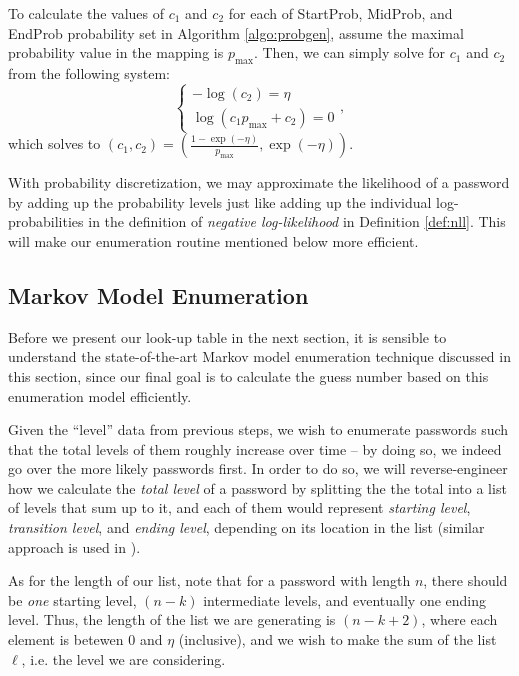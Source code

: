 \documentclass{article} %
\theoremstyle{definition}
\theoremstyle{theorem}
\theoremstyle{remark}
\theoremstyle{remark}
\begin{document}
\par\quad To calculate the values of $c_1$ and $c_2$ for each of StartProb, MidProb, and EndProb probability set in Algorithm \ref{algo:probgen}, assume the maximal probability value in the mapping is $p_{\max}$. Then, we can simply solve for $c_1$ and $c_2$ from the following system:
    \begin{equation}
        \begin{cases}
            -\log(c_2) = \eta\\
            \log(c_1 p_{\max} + c_2) = 0
        \end{cases},
    \end{equation}
which solves to $(c_1, c_2) = \left(\frac{1-\exp(-\eta)}{p_{\max}}, \exp(-\eta)\right)$.

\par\quad With probability discretization, we may approximate the likelihood of a password by adding up the probability levels just like adding up the individual log-probabilities in the definition of \emph{negative log-likelihood} in Definition \ref{def:nll}. This will make our enumeration routine mentioned below more efficient.

\subsection{Markov Model Enumeration} \label{sect:enumeration}
\par\quad Before we present our look-up table in the next section, it is sensible to understand the state-of-the-art Markov model enumeration technique discussed in this section, since our final goal is to calculate the guess number based on this enumeration model efficiently.

\par\quad Given the ``level'' data from previous steps, we wish to enumerate passwords such that the total levels of them roughly increase over time -- by doing so, we indeed go over the more likely passwords first. In order to do so, we will reverse-engineer how we calculate the \emph{total level} of a password by splitting the the total into a list of levels that sum up to it, and each of them would represent \emph{starting level}, \emph{transition level}, and \emph{ending level}, depending on its location in the list (similar approach is used in \cite{omen}).

\par\quad As for the length of our list, note that for a password with length $n$, there should be \emph{one} starting level, $(n-k)$ intermediate levels, and eventually one ending level. Thus, the length of the list we are generating is $(n-k+2)$, where each element is betewen $0$ and $\eta$ (inclusive), and we wish to make the sum of the list $\ell$, i.e. the level we are considering.
\end{document}
